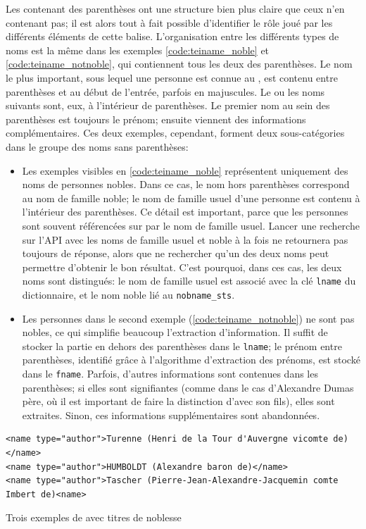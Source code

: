Les \tname{} contenant des parenthèses ont une structure bien plus claire que ceux n'en contenant pas; il est alors tout à fait possible d'identifier le rôle joué par les différents éléments de cette balise. L'organisation entre les différents types de noms est la même dans les exemples \ref{code:teiname_noble} et \ref{code:teiname_notnoble}, qui contiennent tous les deux des parenthèses. Le nom le plus important, sous lequel une personne est connue au , est contenu entre parenthèses et au début de l'entrée, parfois en majuscules. Le ou les noms suivants sont, eux, à l'intérieur de parenthèses. Le premier nom au sein des parenthèses est toujours le prénom; ensuite viennent des informations complémentaires. Ces deux exemples, cependant, forment deux sous-catégories dans le groupe des noms sans parenthèses:
\begin{itemize}
	\item Les exemples visibles en \ref{code:teiname_noble} représentent uniquement des noms de personnes nobles. Dans ce cas, le nom hors parenthèses correspond au nom de famille noble; le nom de famille usuel d'une personne est contenu à l'intérieur des parenthèses. Ce détail est important, parce que les personnes sont souvent référencées sur \wkd{} par le nom de famille usuel. Lancer une recherche sur l'API avec les noms de famille usuel et noble à la fois ne retournera pas toujours de réponse, alors que ne rechercher qu'un des deux noms peut permettre d'obtenir le bon résultat. C'est pourquoi, dans ces cas, les deux noms sont distingués: le nom de famille usuel est associé avec la clé \texttt{lname} du \gls{dictionnaire}, et le nom noble lié au \texttt{nobname\_sts}.
	\item Les personnes dans le second exemple (\ref{code:teiname_notnoble}) ne sont pas nobles, ce qui simplifie beaucoup l'extraction d'information. Il suffit de stocker la partie en dehors des parenthèses dans le \texttt{lname}; le prénom entre parenthèses, identifié grâce à l'algorithme d'extraction des prénoms, est stocké dans le \texttt{fname}. Parfois, d'autres informations sont contenues dans les parenthèses; si elles sont signifiantes (comme dans le cas d'Alexandre Dumas père, où il est important de faire la distinction d'avec son fils), elles sont extraites. Sinon, ces informations supplémentaires sont abandonnées.
\end{itemize}

\begin{listing}[h]
	\begin{verbatim}
<name type="author">Turenne (Henri de la Tour d'Auvergne vicomte de)</name>
<name type="author">HUMBOLDT (Alexandre baron de)</name>
<name type="author">Tascher (Pierre-Jean-Alexandre-Jacquemin comte Imbert de)<name>
	\end{verbatim}
	\caption{Trois exemples de \tname{} avec titres de noblesse}
	\label{code:teiname_noble}
\end{listing}

